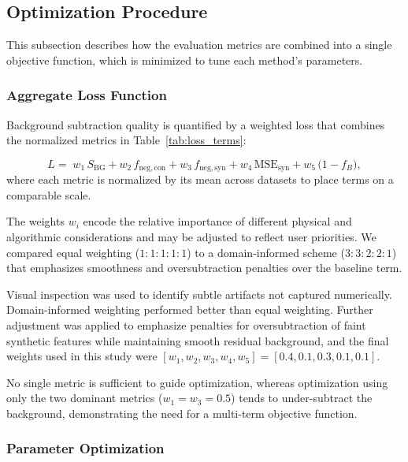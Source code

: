 \documentclass[iucr]{iucrjournals}
\begin{document}
\subsection{Optimization Procedure}

This subsection describes how the evaluation metrics are combined into a single objective function, which is minimized to tune each method's parameters.

\subsubsection{Aggregate Loss Function}

Background subtraction quality is quantified by a weighted loss that combines the normalized metrics in Table~\ref{tab:loss_terms}:

\begin{equation}
L =\;
w_1\, S_{\mathrm{BG}}
+ w_2\, f_{\mathrm{neg,con}}
+ w_3\, f_{\mathrm{neg,syn}}
+ w_4\, \mathrm{MSE}_{\mathrm{syn}}
+ w_5\, \bigl(1 - f_{B}\bigr),
\end{equation}
where each metric is normalized by its mean across datasets to place terms on a comparable scale.

The weights $w_i$ encode the relative importance of different physical and algorithmic considerations and may be adjusted to reflect user priorities. We compared equal weighting ($1\!:\!1\!:\!1\!:\!1\!:\!1$) to a domain-informed scheme ($3\!:\!3\!:\!2\!:\!2\!:\!1$) that emphasizes smoothness and oversubtraction penalties over the baseline term.

Visual inspection was used to identify subtle artifacts not captured numerically. Domain-informed weighting performed better than equal weighting. Further adjustment was applied to emphasize penalties for oversubtraction of faint synthetic features while maintaining smooth residual background, and the final weights used in this study were $[w_1,w_2,w_3,w_4,w_5]=[0.4,0.1,0.3,0.1,0.1]$.


No single metric is sufficient to guide optimization, whereas optimization using only the two dominant metrics ($w_1 = w_3 = 0.5$) tends to under-subtract the background, demonstrating the need for a multi-term objective function.

\subsubsection{Parameter Optimization}
\end{document}
